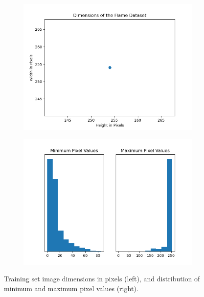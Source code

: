 \documentclass[a4paper,11pt]{article} %
\begin{document}
\begin{figure}[h]
    \centering
    \begin{subfigure}[b]{0.45\textwidth}
        \centering
        \includegraphics[width=\textwidth]{../figures/flame_dataset_image_dimensions.png}
    \end{subfigure}
    \hfill
    \begin{subfigure}[b]{0.45\textwidth}
        \centering 
        \includegraphics[width=\textwidth]{../figures/pixel_ranges.png}
    \end{subfigure}
    \caption{Training set image dimensions in pixels (left), and distribution of minimum and maximum pixel values (right).}
\end{figure}
\end{document}
